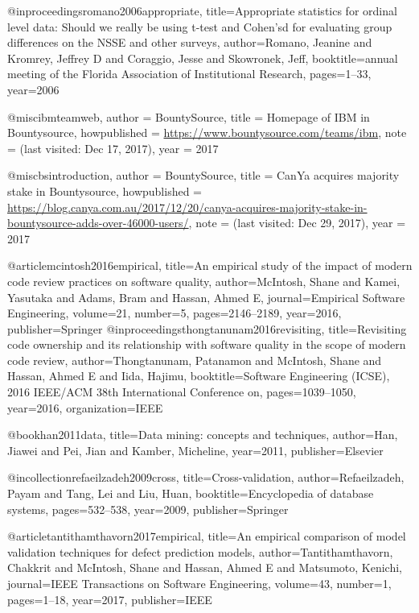 @inproceedings{romano2006appropriate,
  title={Appropriate statistics for ordinal level data: Should we really be using t-test and Cohen’sd for evaluating group differences on the NSSE and other surveys},
  author={Romano, Jeanine and Kromrey, Jeffrey D and Coraggio, Jesse and Skowronek, Jeff},
  booktitle={annual meeting of the Florida Association of Institutional Research},
  pages={1--33},
  year={2006}
}


@misc{ibmteamweb,
  author = {{BountySource}},
  title = {{Homepage of IBM in Bountysource}},
  howpublished = {\url{https://www.bountysource.com/teams/ibm}},
  note = {(last visited: Dec 17, 2017)},
  year = {2017}
}

@misc{bsintroduction,
  author = {{BountySource}},
  title = {{CanYa acquires majority stake in Bountysource}},
  howpublished = {\url{https://blog.canya.com.au/2017/12/20/canya-acquires-majority-stake-in-bountysource-adds-over-46000-users/}},
  note = {(last visited: Dec 29, 2017)},
  year = {2017}
}

@article{mcintosh2016empirical,
  title={An empirical study of the impact of modern code review practices on software quality},
  author={McIntosh, Shane and Kamei, Yasutaka and Adams, Bram and Hassan, Ahmed E},
  journal={Empirical Software Engineering},
  volume={21},
  number={5},
  pages={2146--2189},
  year={2016},
  publisher={Springer}
}
@inproceedings{thongtanunam2016revisiting,
  title={Revisiting code ownership and its relationship with software quality in the scope of modern code review},
  author={Thongtanunam, Patanamon and McIntosh, Shane and Hassan, Ahmed E and Iida, Hajimu},
  booktitle={Software Engineering (ICSE), 2016 IEEE/ACM 38th International Conference on},
  pages={1039--1050},
  year={2016},
  organization={IEEE}
}

@book{han2011data,
  title={Data mining: concepts and techniques},
  author={Han, Jiawei and Pei, Jian and Kamber, Micheline},
  year={2011},
  publisher={Elsevier}
}

@incollection{refaeilzadeh2009cross,
  title={Cross-validation},
  author={Refaeilzadeh, Payam and Tang, Lei and Liu, Huan},
  booktitle={Encyclopedia of database systems},
  pages={532--538},
  year={2009},
  publisher={Springer}
}

@article{tantithamthavorn2017empirical,
  title={An empirical comparison of model validation techniques for defect prediction models},
  author={Tantithamthavorn, Chakkrit and McIntosh, Shane and Hassan, Ahmed E and Matsumoto, Kenichi},
  journal={IEEE Transactions on Software Engineering},
  volume={43},
  number={1},
  pages={1--18},
  year={2017},
  publisher={IEEE}
}

